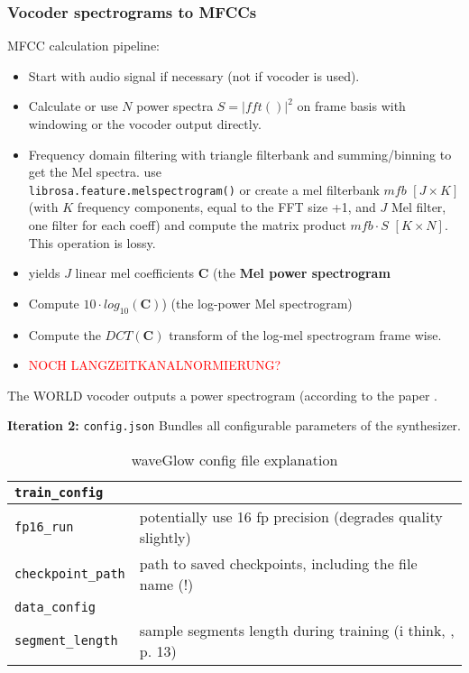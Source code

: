 \documentclass{article}
\begin{document}
\subsubsection*{Vocoder spectrograms to MFCCs}
MFCC calculation pipeline:
\begin{itemize}
\item Start with audio signal if necessary (not if vocoder is used).
\item Calculate or use $N$ power spectra $S=|fft()|^2$ on frame basis with windowing or the vocoder output directly.
\item Frequency domain filtering with triangle filterbank and summing/binning to get the Mel spectra. use \\ \texttt{librosa.feature.melspectrogram()} or create a mel filterbank $mfb\,\,[J\times K]$ (with $K$ frequency components, equal to the FFT size +1, and $J$ Mel filter, one filter for each coeff) and compute the matrix product $mfb\cdot S$ $[K\times N]$. This operation is lossy.
\item yields $J$ linear mel coefficients $\textbf{C}$ (the \textbf{Mel power spectrogram}
\item Compute $10\cdot log_{10}(\textbf{C})$) (the log-power Mel spectrogram)
\item Compute the $DCT(\textbf{C})$ transform of the log-mel spectrogram frame wise.
\item \textcolor{red}{NOCH LANGZEITKANALNORMIERUNG?}
\end{itemize}
   
The WORLD vocoder outputs a power spectrogram (according to the paper \cite{morise2016world}. 

\textbf{Iteration 2:}
\texttt{config.json} Bundles all configurable parameters of the synthesizer.

\begin{table}[htbt] 
\begin{tabular}{ll}
\toprule
\texttt{train\_config} & \\\toprule
\texttt{fp16\_run} & potentially use 16 fp precision (degrades quality slightly) \\
\texttt{checkpoint\_path} & path to saved checkpoints, including the file name (!) \\
\texttt{data\_config} & \\\midrule
\texttt{segment\_length} & sample segments length during training (i think, \cite{waveglow}, p. 13)\\
\bottomrule
\end{tabular}
\caption{waveGlow config file explanation}
\label{tab:waveGlow_config_file}
\end{table}
\end{document}
